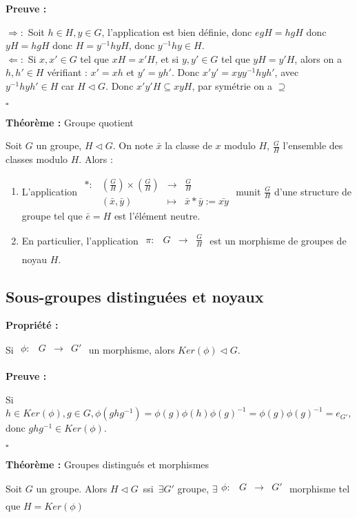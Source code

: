 \documentclass{report}
\renewenvironment{leftbar}{%
  \def\FrameCommand{\vrule width 0.4pt \hspace{10pt}}%
  \MakeFramed {\advance\hsize-\width \FrameRestore}}%
 {\endMakeFramed}%
\newenvironment{preuve}{\vspace*{0.5cm}
    \begin{leftbar}
    \noindent\textbf{Preuve :}\par}{
    \begin{flushright}
    $\square$
    \end{flushright}
    \end{leftbar}
}
\newenvironment{prop}{\begin{tcolorbox}[colframe= white]
    \textbf{Propriété :}
     \par}
    {\end{tcolorbox}}
\newenvironment{theoreme}[1][]{
    \begin{tcolorbox}[]
    \textbf{Théorème :} #1  \par} 
    {\end{tcolorbox}}
\newcommand{\fonction}[5]{
    \begin{array}{l|rcl}
    #1: & #2 & \longrightarrow & #3 \\
        & #4 & \longmapsto & #5 
    \end{array}
}
\newcommand{\fctsarg}[3]{
    \begin{array}{lrcl}
    #1: & #2 & \longrightarrow & #3 \\
    \end{array}
}
\begin{document}
\begin{preuve}
$\Rightarrow :$ Soit $h \in H,y \in G$, l'application est bien définie, donc $egH = hgH$ donc $yH = hgH$ donc $H = y^{-1}hyH$, donc $y^{-1}hy \in H$.\\
$\Leftarrow : $ Si $x,x' \in G$ tel que $xH = x'H$, et si $y,y' \in G$ tel que $yH = y'H$, alors on a $h,h' \in H$ vérifiant : $x' = xh$ et $y' = yh'$. Donc $x'y' = xy y^{-1}hyh'$, avec $y^{-1}hyh' \in H$ car $H \triangleleft G$. Donc $x'y'H \subseteq xyH$, par symétrie on a $\supseteq$
\end{preuve}

\begin{theoreme}[Groupe quotient]
    Soit $G$ un groupe, $H \triangleleft G$. On note $\bar{x}$ la classe de $x$ modulo $H$, $\displaystyle\frac{G}{H}$ l'ensemble des classes modulo $H$. Alors : \par
    \begin{enumerate}
        \item L'application $\fonction{\ast}{(\displaystyle\frac{G}{H})\times (\displaystyle\frac{G}{H})}{\displaystyle\frac{G}{H}}{(\bar{x},\bar{y})}{\bar{x} \ast \bar{y} := \bar{xy}}$ munit $\displaystyle\frac{G}{H}$ d'une structure de groupe tel que $\bar{e} = H$ est l'élément neutre.
        \item En particulier, l'application $\fctsarg{\pi}{G}{\displaystyle\frac{G}{H}}$ est un morphisme de groupes de noyau $H$.
    \end{enumerate}
\end{theoreme}

\subsection{Sous-groupes distinguées et noyaux}

\begin{prop}
    Si $\fctsarg{\phi}{G}{G'}$ un morphisme, alors $Ker(\phi) \triangleleft G$.
\end{prop}

\begin{preuve}
    Si $h \in Ker(\phi), g \in G, \phi(ghg^{-1}) = \phi(g)\phi(h)\phi(g)^{-1} = \phi(g)\phi(g)^{-1} = e_{G'}$, donc $ghg^{-1} \in Ker(\phi)$.
\end{preuve}

\begin{theoreme}[Groupes distingués et morphismes]
    Soit $G$ un groupe. Alors $H \triangleleft G \,$ ssi $\, \exists G'$ groupe, $\exists \fctsarg{\phi}{G}{G'}$ morphisme tel que $H = Ker(\phi)$
\end{theoreme}
\end{document}
